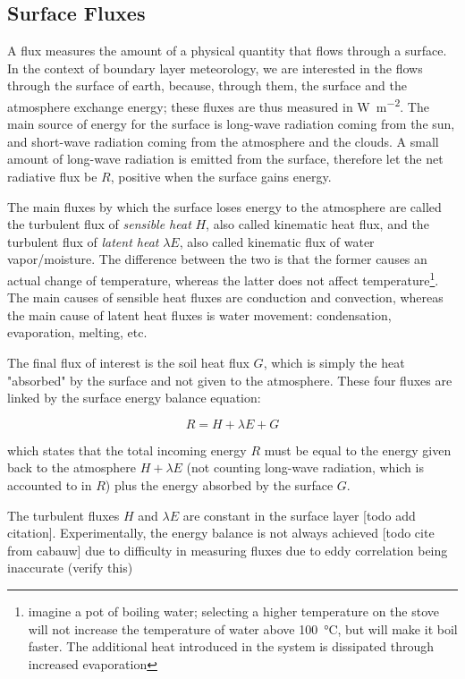 \documentclass[12pt]{book}
\begin{document}
\subsection{Surface Fluxes}
A flux measures the amount of a physical quantity that flows through a surface. In the context of boundary layer meteorology, we are interested in the flows through the surface of earth, because, through them, the surface and the atmosphere exchange energy; these fluxes are thus measured in \si{\watt\per\square\meter}. The main source of energy for the surface is long-wave radiation coming from the sun, and short-wave radiation coming from the atmosphere and the clouds. A small amount of long-wave radiation is emitted from the surface, therefore let the net radiative flux be $R$, positive when the surface gains energy.

The main fluxes by which the surface loses energy to the atmosphere are called the turbulent flux of \emph{sensible heat} $H$, also called kinematic heat flux, and the turbulent flux of \emph{latent heat} $\lambda E$, also called kinematic flux of water vapor/moisture. The difference between the two is that the former causes an actual change of temperature, whereas the latter does not affect temperature\footnote{imagine a pot of boiling water; selecting a higher temperature on the stove will not increase the temperature of water above \SI{100}{\celsius}, but will make it boil faster. The additional heat introduced in the system is dissipated through increased evaporation}. The main causes of sensible heat fluxes are conduction and convection, whereas the main cause of latent heat fluxes is water movement: condensation, evaporation, melting, etc. 

The final flux of interest is the soil heat flux $G$, which is simply the heat "absorbed" by the surface and not given to the atmosphere. These four fluxes are linked by the surface energy balance equation:

$$
R=H+\lambda E+G
$$

which states that the total incoming energy $R$ must be equal to the energy given back to the atmosphere $H+\lambda E$ (not counting long-wave radiation, which is accounted to in $R$) plus the energy absorbed by the surface $G$.

The turbulent fluxes $H$ and $\lambda E$ are constant in the surface layer [todo add citation]. Experimentally, the energy balance is not always achieved [todo cite from cabauw] due to difficulty in measuring fluxes due to eddy correlation being inaccurate (verify this)
\end{document}
